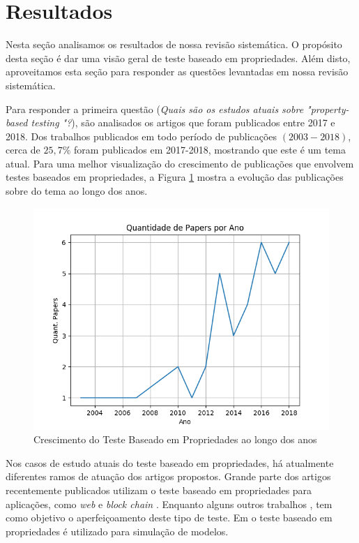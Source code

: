 \section{Resultados} \label{sec:resultados}

	Nesta seção analisamos os resultados de nossa revisão sistemática. O propósito desta seção é dar uma visão geral de teste baseado em propriedades. Além disto, aproveitamos esta seção para responder as questões levantadas em nossa revisão sistemática.

	Para responder a primeira questão (\textit{Quais são os estudos atuais sobre "property-based testing "?}), são analisados os artigos que foram publicados entre 2017 e 2018. Dos trabalhos publicados em todo período de publicações $(2003-2018)$, cerca de $25,7\%$ foram publicados em 2017-2018, mostrando que este é um tema atual. Para uma melhor visualização do crescimento de publicações que envolvem testes baseados em propriedades, a Figura \ref{fig:crescimento}  mostra a evolução das publicações sobre do tema ao longo dos anos.

	\begin{figure}[!ht]
	  \centering
	  \includegraphics[scale=0.5]{Imagens/crescimento.png}
	  \caption{Crescimento do Teste Baseado em Propriedades ao longo dos anos}
      \label{fig:crescimento}
	\end{figure}

	Nos casos de estudo atuais do teste baseado em propriedades, há atualmente diferentes ramos de atuação dos artigos propostos. Grande parte dos artigos recentemente publicados utilizam o teste baseado em propriedades para aplicações,
	como \textit{web} \cite{peleg2018generating, martin2018property, chepurnoy2018checking, almendros2017web}  e \textit{block chain} \cite{aichernig2017property}. Enquanto alguns outros trabalhos \cite{loscher2018automating, hanus2016currycheck}, tem como objetivo o aperfeiçoamento deste tipo de teste. Em \cite{aichernig2017statistical} o teste baseado em propriedades é utilizado para simulação de modelos.


